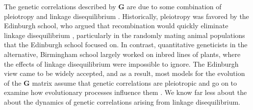 \documentclass[9pt,twocolumn,twoside]{gsajnl}
\newcommand{\G}{\textbf{G }}
\begin{document}
% 
% 
% 
%
% 
% 
% 
%
% 
% 
% 
% 
%

The genetic correlations described by \G are due to some combination of pleiotropy and linkage disequilibrium \cite{Saltz2017}. Historically, pleiotropy was favored by the Edinburgh school, who argued that recombination would quickly eliminate linkage disequilibrium \citep[Chapter~20]{fox2006evolutionary}, particularly in the randomly mating animal populations that the Edinburgh school focused on. In contrast, quantitative geneticists in the alternative, Birmingham school largely worked on inbred lines of plants, where the effects of linkage disequilibrium were impossible to ignore. The Edinburgh view came to be widely accepted, and as a result, most models for the evolution of the \G  matrix assume that genetic correlations are pleiotropic and go on to examine how evolutionary processes influence them \citep{Turelli1988}. We know far less about the about the dynamics of genetic correlations arising from linkage disequilibrium.\par
\end{document}
